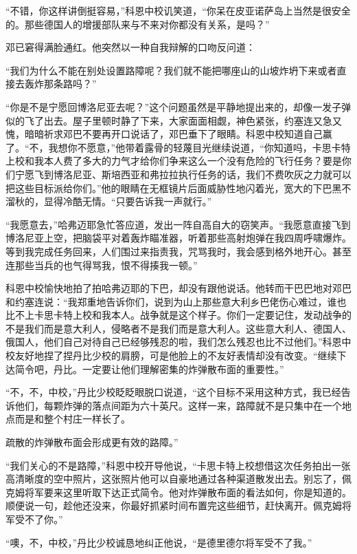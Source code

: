    “不错，你这样讲倒挺容易，”科恩中校讥笑道，“你呆在皮亚诺萨岛上当然是很安全的。那些德国人的增援部队来与不来对你都没有关系，是吗？”

    邓已窘得满脸通红。他突然以一种自我辩解的口吻反问道：

    “我们为什么不能在别处设置路障呢？我们就不能把哪座山的山坡炸坍下来或者直接去轰炸那条路吗？”

    “你是不是宁愿回博洛尼亚去呢？”这个问题虽然是平静地提出来的，却像一发子弹似的飞了出去。屋子里顿时静了下来，大家面面相觑，神色紧张，约塞连又急又愧，暗暗祈求邓巴不要再开口说话了，邓巴垂下了眼睛。科恩中校知道自己赢了。“不，我想你不愿意，”他带着露骨的轻蔑目光继续说道，“你知道吗，卡思卡特上校和我本人费了多大的力气才给你们争来这么一个没有危险的飞行任务？要是你们宁愿飞到博洛尼亚、斯培西亚和弗拉拉执行任务的话，我们不费吹灰之力就可以把这些目标派给你们。”他的眼睛在无框镜片后面威胁性地闪着光，宽大的下巴黑不溜秋的，显得冷酷无情。“只要告诉我一声就行。”

    “我愿意去，”哈弗迈耶急忙答应道，发出一阵自高自大的窃笑声。“我愿意直接飞到博洛尼亚上空，把脑袋平对着轰炸瞄准器，听着那些高射炮弹在我四周呼啸爆炸。等到我完成任务回来，人们围过来指责我，咒骂我时，我会感到格外地开心。甚至连那些当兵的也气得骂我，恨不得揍我一顿。”
 


    科恩中校愉快地拍了拍哈弗迈耶的下巴，却没有跟他说话。他转而干巴巴地对邓巴和约塞连说：“我郑重地告诉你们，说到为山上那些意大利乡巴佬伤心难过，谁也比不上卡思卡特上校和我本人。战争就是这个样子。你们一定要记住，发动战争的不是我们而是意大利人，侵略者不是我们而是意大利人。这些意大利人、德国人、俄国人，他们自己对待自己已经够残忍的啦，我们怎么残忍也比不过他们。”科恩中校友好地捏了捏丹比少校的肩膀，可是他脸上的不友好表情却没有改变。“继续下达简令吧，丹比。一定要让他们理解密集的炸弹散布面的重要性。”

    “不，不，中校，”丹比少校眨眨眼脱口说道，“这个目标不采用这种方式，我已经告诉他们，每颗炸弹的落点间距为六十英尺。这样一来，路障就不是只集中在一个地点而是和整个村庄一样长了。

    疏散的炸弹散布面会形成更有效的路障。”

    “我们关心的不是路障，”科恩中校开导他说，“卡思卡特上校想借这次任务拍出一张高清晰度的空中照片，这张照片他可以自豪地通过各种渠道散发出去。别忘了，佩克姆将军要来这里听取下达正式简令。他对炸弹散布面的看法如何，你是知道的。顺便说一句，趁他还没来，你最好抓紧时间布置完这些细节，赶快离开。佩克姆将军受不了你。”

    “噢，不，中校，”丹比少校诚恳地纠正他说，“是德里德尔将军受不了我。”

